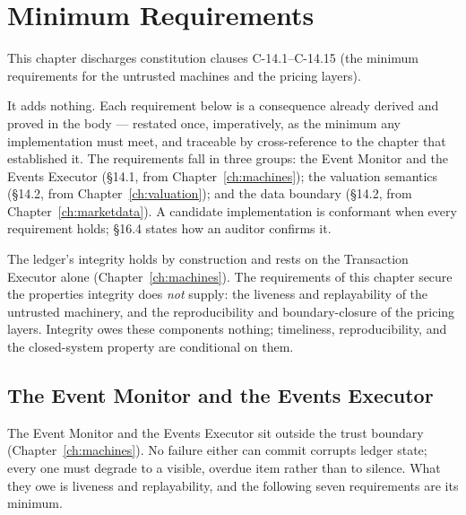 \section{Minimum Requirements}\label{ch:requirements}

This chapter discharges constitution clauses C-14.1--C-14.15 (the minimum requirements for the untrusted machines and the pricing layers).

It adds nothing. Each requirement below is a consequence already derived and proved in
the body --- restated once, imperatively, as the minimum any implementation must meet, and
traceable by cross-reference to the chapter that established it. The requirements fall in
three groups: the Event Monitor and the Events Executor (\S 14.1, from
Chapter~\ref{ch:machines}); the valuation semantics (\S 14.2, from
Chapter~\ref{ch:valuation}); and the data boundary (\S 14.2, from
Chapter~\ref{ch:marketdata}). A candidate implementation is conformant when every
requirement holds; \S 16.4 states how an auditor confirms it.

\begin{principle}
The ledger's integrity holds by construction and rests on the Transaction Executor alone
(Chapter~\ref{ch:machines}). The requirements of this chapter secure the properties
integrity does \emph{not} supply: the liveness and replayability of the untrusted
machinery, and the reproducibility and boundary-closure of the pricing layers. Integrity
owes these components nothing; timeliness, reproducibility, and the closed-system property
are conditional on them.
\end{principle}

\subsection{The Event Monitor and the Events Executor}

The Event Monitor and the Events Executor sit outside the trust boundary
(Chapter~\ref{ch:machines}). No failure either can commit corrupts ledger state; every one
must degrade to a visible, overdue item rather than to silence. What they owe is liveness
and replayability, and the following seven requirements are its minimum.

